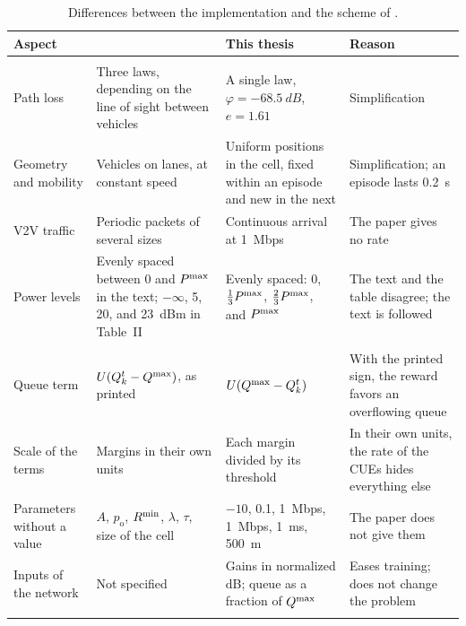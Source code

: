 \begin{table}[tbp]
  \centering
  \linespread{1}\small
  \caption[Differences from Li et al. (2022)]{Differences between the implementation and the scheme of
    \citet{li+22fedmarl}.}
  \label{tab:exp-differences}
  \begin{tabularx}{\textwidth}{@{}>{\raggedright\arraybackslash}p{2.6cm}
      >{\raggedright\arraybackslash}X >{\raggedright\arraybackslash}X
      >{\raggedright\arraybackslash}X@{}}
    \toprule
    Aspect & \citet{li+22fedmarl} & This thesis & Reason \\
    \midrule
    \multicolumn{4}{@{}l}{\emph{Scenario}} \\
    Path loss & Three laws, depending on the line of sight between vehicles & A single law,
      $\varphi = \SI{-68.5}{dB}$, $e = 1.61$ & Simplification \\
    Geometry and mobility & Vehicles on lanes, at constant speed & Uniform positions in the cell, fixed within
      an episode and new in the next & Simplification; an episode lasts \SI{0.2}{\second} \\
    \acs{V2V} traffic & Periodic packets of several sizes & Continuous arrival at \SI{1}{Mbps} & The paper
      gives no rate \\
    Power levels & Evenly spaced between 0 and $P^{\mathrm{max}}$ in the text; $-\infty$, 5, 20, and \SI{23}{dBm} in
      Table~II & Evenly spaced: 0, $\tfrac13P^{\mathrm{max}}$, $\tfrac23P^{\mathrm{max}}$, and $P^{\mathrm{max}}$ & The text and the table
      disagree; the text is followed \\
    \midrule
    \multicolumn{4}{@{}l}{\emph{Reward and its parameters}} \\
    Queue term & $U(Q_k^t - Q^{\mathrm{max}})$, as printed & $U(Q^{\mathrm{max}} - Q_k^t)$ & With the printed sign, the reward
      favors an overflowing queue \\
    Scale of the terms & Margins in their own units & Each margin divided by its threshold & In their own
      units, the rate of the \acsp{CUE} hides everything else \\
    Parameters without a value & $A$, $p_{\mathrm{o}}$, $R^{\mathrm{min}}$, $\lambda$, $\tau$, size of the cell &
      $-10$, 0.1, \SI{1}{Mbps}, \SI{1}{Mbps}, \SI{1}{\milli\second}, \SI{500}{\meter} & The paper does not
      give them \\
    Inputs of the network & Not specified & Gains in normalized dB; queue as a fraction of $Q^{\mathrm{max}}$ & Eases
      training; does not change the problem \\
    \midrule
    \multicolumn{4}{@{}l}{\emph{Training}} \\

\end{tabularx}
\end{table}

